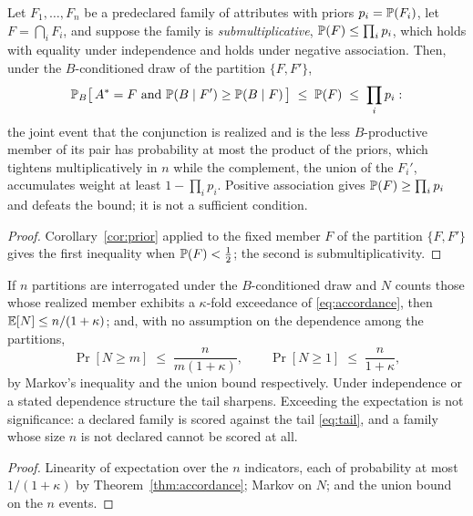 \begin{proposition}\label{prop:stockpile}
Let $F_1,\dots,F_n$ be a predeclared family of attributes with priors
$p_i=\mathbb{P}(F_i)$, let $F=\bigcap_iF_i$, and suppose the family is
\emph{submultiplicative}, $\mathbb{P}(F)\le\prod_ip_i$, which holds with
equality under independence and holds under negative association. Then,
under the $B$-conditioned draw of the partition $\{F,F'\}$,
\begin{equation}\label{eq:stockpile}
\mathbb{P}_B\bigl[\,A^\ast=F\ \text{and}\ \mathbb{P}(B\mid F')\ge\mathbb{P}(B\mid F)\,\bigr]
\;\le\;\mathbb{P}(F)\;\le\;\prod_ip_i:
\end{equation}
the joint event that the conjunction is realized and is the less
$B$-productive member of its pair has probability at most the product
of the priors, which tightens multiplicatively in $n$ while the
complement, the union of the $F_i'$, accumulates weight at least $1-\prod_ip_i$.
Positive association gives $\mathbb{P}(F)\ge\prod_ip_i$ and defeats the bound;
it is not a sufficient condition.
\end{proposition}

\begin{proof}
Corollary~\ref{cor:prior} applied to the fixed member $F$ of the
partition $\{F,F'\}$ gives the first inequality when $\mathbb{P}(F)<\tfrac12$;
the second is submultiplicativity.
\end{proof}

\begin{proposition}
\label{prop:guard}
If $n$ partitions are interrogated under the $B$-conditioned draw and
$N$ counts those whose realized member exhibits a $\kappa$-fold
exceedance of \eqref{eq:accordance}, then $\mathbb{E}[N]\le n/(1+\kappa)$; and,
with no assumption on the dependence among the partitions,
\begin{equation}\label{eq:tail}
\Pr[N\ge m]\;\le\;\frac{n}{m(1+\kappa)},\qquad
\Pr[N\ge1]\;\le\;\frac{n}{1+\kappa},
\end{equation}
by Markov's inequality and the union bound respectively. Under
independence or a stated dependence structure the tail sharpens.
Exceeding the expectation is not significance: a declared family is
scored against the tail \eqref{eq:tail}, and a family whose size $n$ is
not declared cannot be scored at all.
\end{proposition}

\begin{proof}
Linearity of expectation over the $n$ indicators, each of probability
at most $1/(1+\kappa)$ by Theorem~\ref{thm:accordance}; Markov on $N$;
and the union bound on the $n$ events.
\end{proof}

